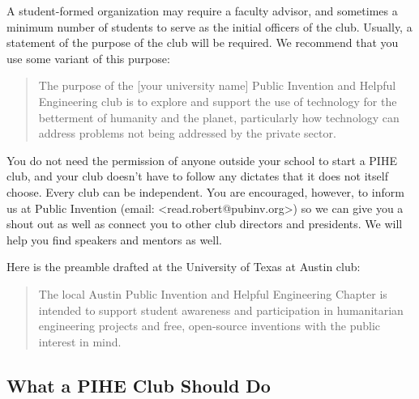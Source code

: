 \documentclass[
	fontsize=10pt, %
	twoside=false, %
	secnumdepth=1, %
]{kaobook}
\begin{document}
A student-formed organization may require a faculty advisor, and sometimes a minimum number of students to serve as the initial officers of the club. Usually, a statement of the purpose of the club will be required. We recommend that you use some variant of this purpose:

\blockquote{
The purpose of the [your university name] Public Invention and Helpful Engineering club is to explore and support the use of technology for the betterment of humanity and the planet, particularly how technology can address problems not being addressed by the private sector.
}

You do not need the permission of anyone outside your school to start a PIHE club, and your club doesn’t have to follow any dictates that it does not itself choose. Every club can be independent. You are encouraged, however, to inform us at Public Invention (email: <read.robert@pubinv.org>)  so we can give you a shout out as well as connect you to other club directors and presidents. We will help you find speakers and mentors as well.

Here is the preamble drafted at the University of Texas at Austin club:
\blockquote{
The local Austin Public Invention and Helpful Engineering Chapter is intended to support student awareness and participation in humanitarian engineering projects and free, open-source inventions with the public interest in mind.
}

\subsection{What a PIHE Club Should Do}
\end{document}
